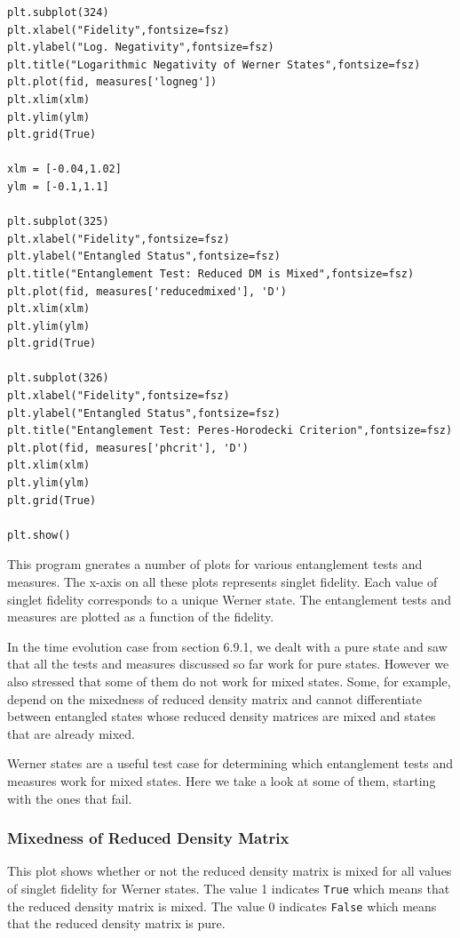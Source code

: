 \begin{verbatim}
plt.subplot(324)
plt.xlabel("Fidelity",fontsize=fsz)
plt.ylabel("Log. Negativity",fontsize=fsz)
plt.title("Logarithmic Negativity of Werner States",fontsize=fsz)
plt.plot(fid, measures['logneg'])
plt.xlim(xlm)
plt.ylim(ylm)
plt.grid(True)

xlm = [-0.04,1.02]
ylm = [-0.1,1.1]

plt.subplot(325)
plt.xlabel("Fidelity",fontsize=fsz)
plt.ylabel("Entangled Status",fontsize=fsz)
plt.title("Entanglement Test: Reduced DM is Mixed",fontsize=fsz)
plt.plot(fid, measures['reducedmixed'], 'D')
plt.xlim(xlm)
plt.ylim(ylm)
plt.grid(True)

plt.subplot(326)
plt.xlabel("Fidelity",fontsize=fsz)
plt.ylabel("Entangled Status",fontsize=fsz)
plt.title("Entanglement Test: Peres-Horodecki Criterion",fontsize=fsz)
plt.plot(fid, measures['phcrit'], 'D')
plt.xlim(xlm)
plt.ylim(ylm)
plt.grid(True)

plt.show()

\end{verbatim}

\par This program gnerates a number of plots for various entanglement tests and measures. The x-axis on all these plots represents singlet fidelity. Each value of singlet fidelity corresponds to a unique Werner state. The entanglement tests and measures are plotted as a function of the fidelity.
\par In the time evolution case from section 6.9.1, we dealt with a pure state and saw that all the tests and measures discussed so far work for pure states. However we also stressed that some of them do not work for mixed states. Some, for example, depend on the mixedness of reduced density matrix and cannot differentiate between entangled states whose reduced density matrices are mixed and states that are already mixed.
\par Werner states are a useful test case for determining which entanglement tests and measures work for mixed states. Here we take a look at some of them, starting with the ones that fail.


\subsubsection{Mixedness of Reduced Density Matrix}
This plot shows whether or not the reduced density matrix is mixed for all values of singlet fidelity for Werner states. The value 1 indicates \texttt{True} which means that the reduced density matrix is mixed. The value 0 indicates \texttt{False} which means that the reduced density matrix is pure.

